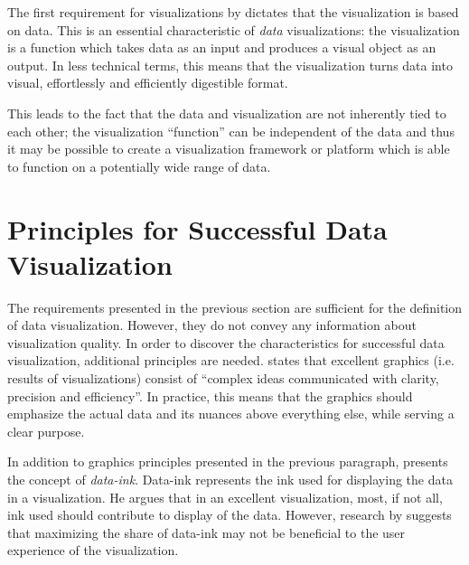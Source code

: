 The first requirement for visualizations by \citet{kosara_visualization_2007} dictates that the visualization is based on data. This is an essential characteristic of \emph{data} visualizations: the visualization is a function which takes data as an input and produces a visual object as an output. In less technical terms, this means that the visualization turns data into visual, effortlessly and efficiently digestible format.

This leads to the fact that the data and visualization are not inherently tied to each other; the visualization ``function'' can be independent of the data and thus it may be possible to create a visualization framework or platform which is able to function on a potentially wide range of data.



\section{Principles for Successful Data Visualization}

The requirements presented in the previous section are sufficient for the definition of data visualization. However, they do not convey any information about visualization quality. In order to discover the characteristics for successful data visualization, additional principles are needed. \citet[p.~13]{tufte_visual_1986} states that excellent graphics (i.e. results of visualizations) consist of ``complex ideas communicated with clarity, precision and efficiency''. In practice, this means that the graphics should emphasize the actual data and its nuances above everything else, while serving a clear purpose.

In addition to graphics principles presented in the previous paragraph, \citet[p.~93]{tufte_visual_1986} presents the concept of \emph{data-ink}. Data-ink represents the ink used for displaying the data in a visualization. He argues that in an excellent visualization, most, if not all, ink used should contribute to display of the data. However, research by \citet{inbar_minimalism_2007} suggests that maximizing the share of data-ink may not be beneficial to the user experience of the visualization. 

